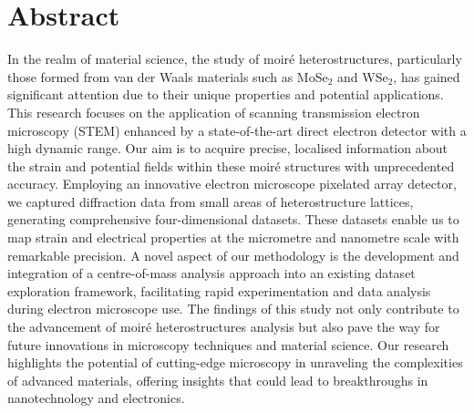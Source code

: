 \chapter*{Abstract}
%
In the realm of material science, the study of moiré heterostructures, particularly those formed from van der Waals materials such as MoSe$_2$ and WSe$_2$, has gained significant attention due to their unique properties and potential applications. 
%
This research focuses on the application of scanning transmission electron microscopy (STEM) enhanced by a state-of-the-art direct electron detector with a high dynamic range. 
%
Our aim is to acquire precise, localised information about the strain and potential fields within these moiré structures with unprecedented accuracy. 
%
Employing an innovative electron microscope pixelated array detector, we captured diffraction data from small areas of heterostructure lattices, generating comprehensive four-dimensional datasets. 
%
These datasets enable us to map strain and electrical properties at the micrometre and nanometre scale with remarkable precision. 
%
A novel aspect of our methodology is the development and integration of a centre-of-mass analysis approach into an existing dataset exploration framework, facilitating rapid experimentation and data analysis during electron microscope use. 
%
The findings of this study not only contribute to the advancement of moiré heterostructures analysis but also pave the way for future innovations in microscopy techniques and material science. 
%
Our research highlights the potential of cutting-edge microscopy in unraveling the complexities of advanced materials, offering insights that could lead to breakthroughs in nanotechnology and electronics.